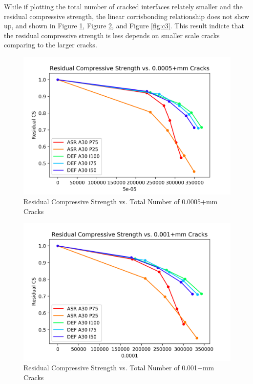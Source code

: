 While if plotting the total number of cracked interfaces relately smaller and the residual compressive strength, the linear corrisbonding relationship does not show up, and shown in Figure \ref{fig:c1}, Figure \ref{fig:c2}, and Figure \ref{fig:c3}. This result indicte that the residual compressive strength is less depends on smaller scale cracks comparing to the larger cracks.

\begin{figure}[ht!]
\centering
\includegraphics[width=.8\linewidth]{Files/exp_3D/1.png}
  \caption{Residual Compressive Strength vs. Total Number of 0.0005+mm Cracks}
  \label{fig:c1}
\end{figure}

\begin{figure}[ht!]
\centering
\includegraphics[width=.8\linewidth]{Files/exp_3D/2.png}
  \caption{Residual Compressive Strength vs. Total Number of 0.001+mm Cracks}
  \label{fig:c2}
\end{figure}

